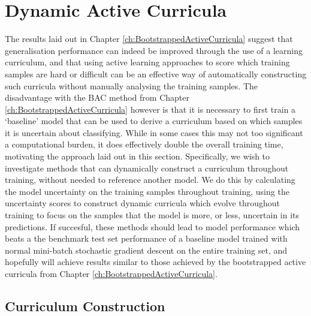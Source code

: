 \chapter{Dynamic Active Curricula}
The results laid out in Chapter \ref{ch:BootstrappedActiveCurricula} suggest that generalisation performance can indeed be improved through the use of a learning curriculum, and that using active learning approaches to score which training samples are hard or difficult can be an effective way of automatically constructing such curricula without manually analysing the training samples. The disadvantage with the BAC method from Chapter \ref{ch:BootstrappedActiveCurricula} however is that it is necessary to first train a `baseline' model that can be used to derive a curriculum based on which samples it is uncertain about classifying. While in some cases this may not too significant a computational burden, it does effectively double the overall training time, motivating the approach laid out in this section. Specifically, we wish to investigate methods that can dynamically construct a curriculum throughout training, without needed to reference another model. We do this by calculating the model uncertainty on the training samples throughout training, using the uncertainty scores to construct dynamic curricula which evolve throughout training to focus on the samples that the model is more, or less, uncertain in its predictions. If succesful, these methods should lead to model performance which beats a the benchmark test set performance of a baseline model trained with normal mini-batch stochastic gradient descent on the entire training set, and hopefully will achieve results similar to those achieved by the bootstrapped active curricula from Chapter \ref{ch:BootstrappedActiveCurricula}.
\section{Curriculum Construction}

